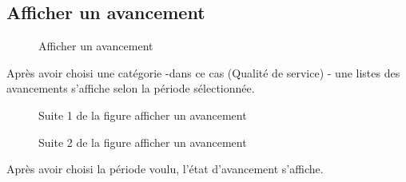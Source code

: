 \documentclass[a4paper]{report}
\begin{document}
\subsection{Afficher un avancement}
\begin{figure}[H]
	\begin{center}
		\caption{Afficher un avancement}
	\end{center}
\end{figure}
Après avoir choisi une catégorie -dans ce cas (Qualité de service) - une listes des avancements s'affiche selon la période sélectionnée.
\begin{figure}[H]
	\begin{center}
		\caption{Suite 1 de la figure afficher un avancement}
	\end{center}
\end{figure}
\begin{figure}[H]
	\begin{center}
		\caption{Suite 2 de la figure afficher un avancement}
	\end{center}
\end{figure}
Après avoir choisi la période voulu, l'état d'avancement s'affiche.
\end{document}
